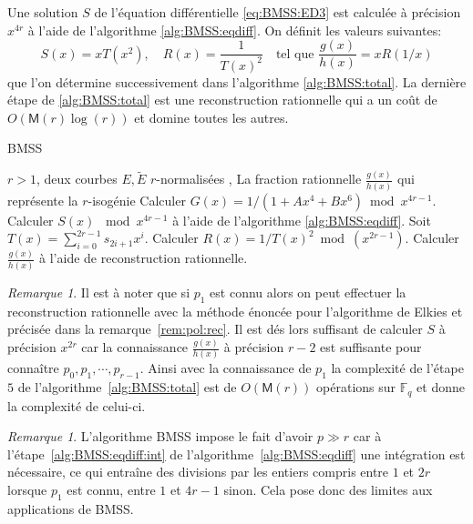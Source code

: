 \documentclass[10pt,a4paper]{book}
\theoremstyle{plain}
\theoremstyle{definition}
\theoremstyle{definition}
\theoremstyle{definition}
\theoremstyle{definition}
\theoremstyle{definition}
\theoremstyle{remark}
\newtheorem{rem}[thm]{Remarque}
\theoremstyle{remark}
\theoremstyle{definition}
\begin{document}
Une solution $S$ de l'équation différentielle \eqref{eq:BMSS:ED3} est calculée à précision $x^{4r}$ à l'aide de l'algorithme \ref{alg:BMSS:eqdiff}. On définit les valeurs suivantes:
\begin{equation}
S(x)=xT(x^2), \quad R(x)=\frac{1}{T(x)^2} \quad \text{tel que } \frac{g(x)}{h(x)}=xR(1/x)
\end{equation}
que l'on détermine successivement dans l'algorithme \ref{alg:BMSS:total}. La dernière étape de \ref{alg:BMSS:total} est une reconstruction rationnelle qui a un coût de $O(\mathsf{M}(r)\log(r))$ \cite[Théorème 7.5]{algeff17} et domine toutes les autres.

\begin{algorithm}
\caption{\label{alg:BMSS:total} BMSS}
\begin{algorithmic}[1]
\REQUIRE $r>1$, deux courbes $E,\tilde{E}$ $r$-normalisées  ,%
\ENSURE La fraction rationnelle $\frac{g(x)}{h(x)}$ qui représente la $r$-isogénie
\STATE Calculer $G(x)=1/(1+Ax^4+Bx^6) \bmod x^{4r-1}$.
\STATE \label{alg:BMSS:total:eqdiff} Calculer $S(x)$ $\bmod x^{4r-1}$ à l'aide de l'algorithme \ref{alg:BMSS:eqdiff}.
\STATE Soit $T(x)=\sum_{i=0}^{2r-1}s_{2i+1}x^i$.
\STATE Calculer $R(x)=1/T(x)^2 \bmod(x^{2r-1})$.
\STATE Calculer $\frac{g(x)}{h(x)}$ à l'aide de reconstruction rationnelle. 
\end{algorithmic}
\end{algorithm}

\begin{rem}
Il est à noter que si $p_1$ est connu alors on peut effectuer la reconstruction
rationnelle avec la méthode énoncée pour l'algorithme de Elkies et précisée 
dans la remarque~\ref{rem:pol:rec}. Il est dés lors suffisant de calculer $S$ à
précision $x^{2r}$ car la connaissance $\frac{g(x)}{h(x)}$ à précision 
$r-2$ est suffisante pour connaître $p_0,p_1,\cdots ,p_{r-1}$. Ainsi avec
la connaissance de $p_1$ la complexité de l'étape $5$ de 
l'algorithme~\ref{alg:BMSS:total} est de $O(\mathsf{M}(r))$ opérations sur 
$\mathbb{F}_q$ et donne la complexité de celui-ci.
\end{rem}

\begin{rem}
L'algorithme BMSS impose le fait d'avoir $p \gg r$ car à 
l'étape~\ref{alg:BMSS:eqdiff:int} de l'algorithme~\ref{alg:BMSS:eqdiff} une 
intégration est nécessaire, ce qui entraîne des divisions par les entiers 
compris entre $1$ et $2r$ lorsque $p_1$ est connu, entre $1$ et $4r-1$ 
sinon. Cela pose donc des limites aux applications de BMSS.
\end{rem}
\end{document}
